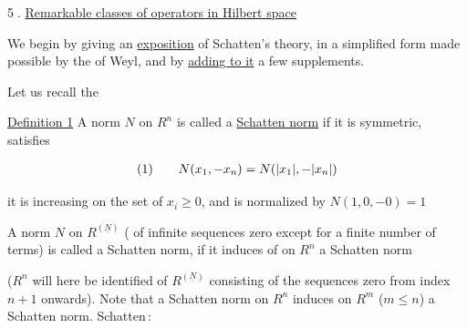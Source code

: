 
\textcircled{5.} \uline{Remarkable classes of operators in Hilbert space}

We begin by giving an {\color{red}\uline{\color{black}exposition}} of Schatten's theory,  in a simplified form made possible by the  of Weyl, and by {\color{red}\uline{\color{black}adding to it}} a few  supplements.

{\reversemarginpar{}}

 Let us recall the

{\reversemarginpar{}}
\uline{Definition 1}  A norm $N$ on $R^n$ is called a \uline{Schatten norm} if it is symmetric, satisfies


\[
\begin{array}{@{}l@{\qquad}l@{}}
(1)&\displaystyle N(x_1,\mathord{-}x_n)=N(|x_1|,\mathord{-}|x_n|)
\end{array}
\]

  it is increasing  on the set of $x_i\geq 0$, and  is normalized by $N(1,0,\mathord{-}0)=1$

A norm $N$ on $R^{(\underline N)}$  ( of infinite sequences  zero except for a finite number of terms) is called a Schatten norm, if  it induces  of on $R^n$ a Schatten norm

($R^n$ will here be identified  of $R^{(\underline N)}$ consisting of the sequences zero from index $n+1$ onwards). Note that a Schatten norm on $R^n$ induces on $R^m$ ($m\leq n$) a Schatten norm.  Schatten\,:


